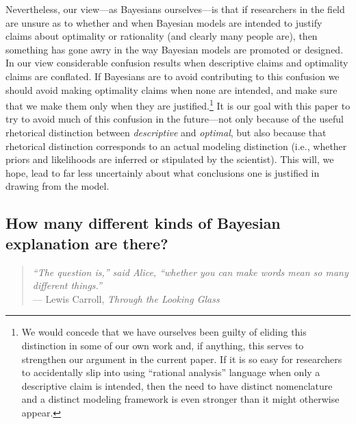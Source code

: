 \documentclass[doc,floatsintext]{apa6}
\begin{document}
Nevertheless, our view---as Bayesians ourselves---is that if researchers in the field are unsure as to whether and when Bayesian models are intended to justify claims about optimality or rationality (and clearly many people are), then something has gone awry in the way Bayesian models are promoted or designed. In our view considerable confusion results when descriptive claims and optimality claims are conflated. If Bayesians are to avoid contributing to this confusion we should avoid making optimality claims when none are intended, and make sure that we make them only when they are justified.\footnote{We would concede that we have ourselves been guilty of eliding this distinction in some of our own work and, if anything, this serves to strengthen our argument in the current paper. If it is so easy for researchers to accidentally slip into using ``rational analysis'' language when only a descriptive claim is intended, then the need to have distinct nomenclature and a distinct modeling framework is even stronger than it might otherwise appear.} It is our goal with this paper to try to avoid much of this confusion in the future---not only because of the useful rhetorical distinction between {\it descriptive} and {\it optimal}, but also because that rhetorical distinction corresponds to an actual modeling distinction (i.e., whether priors and likelihoods are inferred or stipulated by the scientist). This will, we hope, lead to far less uncertainly about what conclusions one is justified in drawing from the model.


\subsection*{How many different kinds of Bayesian explanation are there?}

\begin{quote}
{\it ``The question is,'' said Alice, ``whether you can make words mean so many different things.''} \\
\hspace*{2cm} --- Lewis Carroll, {\it Through the Looking Glass}
\end{quote}
\end{document}
